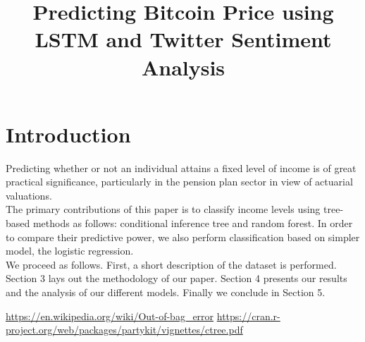 \documentclass[conference]{IEEEtran}
\begin{document}
\title{Predicting Bitcoin Price using LSTM and Twitter Sentiment Analysis\\
}

\author{\IEEEauthorblockN{}
\and
\IEEEauthorblockN{}
}



\section{Introduction}
	Predicting whether or not an individual attains a fixed level of income is of great practical significance, particularly in the pension plan sector in view of actuarial valuations.\\
	The primary contributions of this paper is to classify income levels using tree-based methods as follows: conditional inference tree and random forest. In order to compare their predictive power, we also perform classification based on simpler model, the logistic regression.  \\ 
	We proceed as follows. First, a short description of the dataset is performed. Section 3 lays out the methodology of our paper. Section 4 presents our results and the analysis of our different models. Finally we conclude in Section 5.     



\begin{thebibliography}{2}
 \url{https://en.wikipedia.org/wiki/Out-of-bag_error}
 \url{https://cran.r-project.org/web/packages/partykit/vignettes/ctree.pdf}
\end{thebibliography}
\end{document}
